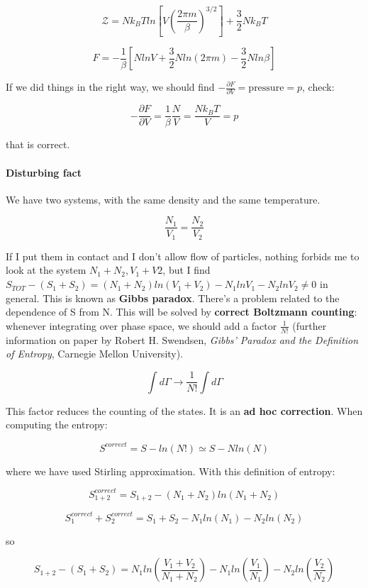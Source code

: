 \documentclass[a4paper, italian, openany]{book}
\begin{document}
$$\mathcal{Z} = N k_B T ln \left [ V (\frac{2\pi m}{\beta})^{3/2} \right] + \frac{3}{2} N k_B T$$

$$F = -\frac{1}{\beta} \left [ N ln V + \frac{3}{2} N ln(2\pi m) - \frac{3}{2} N ln \beta \right ]$$

If we did things in the right way, we should find $- \frac{\partial F}{\partial V} = \mbox{pressure} = p$, check:

$$- \frac{\partial F}{\partial V} = \frac{1}{\beta} \frac{N}{V} = \frac{N k_B T}{V} = p$$

that is correct.

\paragraph{Disturbing fact}

We have two systems, with the same density and the same temperature.

$$\frac{N_1}{V_1} = \frac{N_2}{V_2}$$

If I put them in contact and I don't allow flow of particles, nothing forbids me to look at the system $N_1 + N_2, V_1 + V2$, but I find $S_{TOT} - (S_1 + S_2) = (N_1 + N_2) ln(V_1 + V_2) - N_1 ln V_1 - N_2 ln V_2 \ne 0$ in general. This is known as \textbf{Gibbs paradox}. There's a problem related to the dependence of S from N. This will be solved by \textbf{correct Boltzmann counting}: whenever integrating over phase space, we should add a factor $\frac{1}{N!}$ (further information on paper by Robert H. Swendsen, \textit{Gibbs' Paradox and the Definition of Entropy}, Carnegie Mellon University).

$$\int d\Gamma \rightarrow \frac{1}{N!}\int d\Gamma$$

This factor reduces the counting of the states. It is an \textbf{ad hoc correction}. When computing the entropy:

$$S^{correct} = S - ln(N!) \simeq S - Nln(N) $$

where we have used Stirling approximation. With this definition of entropy:

$$S_{1+2}^{correct} = S_{1+2} - (N_1+N_2)ln(N_1+N_2)$$

$$S_{1}^{correct} + S_2^{correct} = S_1 + S_2 - N_1ln(N_1) - N_2 ln(N_2)$$

so

$$S_{1+2}-(S_{1}+S_{2}) = N_1 ln \left ( \frac{V_1+V_2}{N_1+N_2} \right ) - N_1 ln \left ( \frac{V_1}{N_1} \right ) - N_2 ln \left ( \frac{V_2}{N_2}\right )$$
\end{document}
